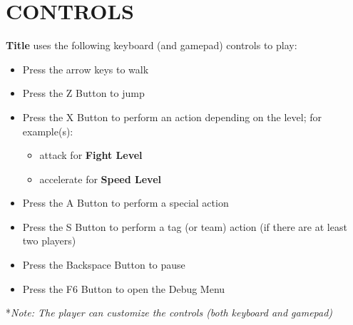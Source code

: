 \documentclass[11pt]{article}
\begin{document}
	\subsection*{}
	
	\subsection*{}
	
	\section*{CONTROLS}
	\textbf{Title} uses the following keyboard (and gamepad) controls to play:
	\begin{itemize}[noitemsep]
		\item Press the arrow keys to walk
		\item Press the Z Button to jump
		\item Press the X Button to perform an action depending on the level; for example(s):
		\begin{itemize}[noitemsep,nosep]
			\item attack for \textbf{Fight Level}
			\item accelerate for \textbf{Speed Level}
		\end{itemize}
		\item Press the A Button to perform a special action
		\item Press the S Button to perform a tag (or team) action (if there are at least two players)
		\item Press the Backspace Button to pause
		\item Press the F6 Button to open the Debug Menu
	\end{itemize}
	*\textit{Note: The player can customize the controls (both keyboard and gamepad)}
	\newpage
\end{document}
